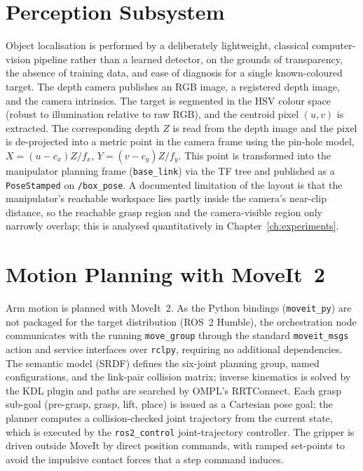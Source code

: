 \section{Perception Subsystem}
Object localisation is performed by a deliberately lightweight, classical
computer-vision pipeline rather than a learned detector, on the grounds of
transparency, the absence of training data, and ease of diagnosis for a single
known-coloured target. The depth camera publishes an RGB image, a registered depth
image, and the camera intrinsics. The target is segmented in the HSV colour space
(robust to illumination relative to raw RGB), and the centroid pixel $(u,v)$ is
extracted. The corresponding depth $Z$ is read from the depth image and the pixel is
de-projected into a metric point in the camera frame using the pin-hole model,
$X = (u-c_x)Z/f_x$, $Y = (v-c_y)Z/f_y$. This point is transformed into the
manipulator planning frame (\texttt{base\_link}) via the TF tree and published as a
\texttt{PoseStamped} on \texttt{/box\_pose}. A documented limitation of the layout is
that the manipulator's reachable workspace lies partly inside the camera's near-clip
distance, so the reachable grasp region and the camera-visible region only narrowly
overlap; this is analysed quantitatively in Chapter~\ref{ch:experiments}.

\section{Motion Planning with MoveIt~2}
Arm motion is planned with MoveIt~2. As the Python bindings (\texttt{moveit\_py}) are
not packaged for the target distribution (ROS~2 Humble), the orchestration node
communicates with the running \texttt{move\_group} through the standard
\texttt{moveit\_msgs} action and service interfaces over \texttt{rclpy}, requiring no
additional dependencies. The semantic model (SRDF) defines the six-joint planning
group, named configurations, and the link-pair collision matrix; inverse kinematics
is solved by the KDL plugin and paths are searched by OMPL's RRTConnect. Each grasp
sub-goal (pre-grasp, grasp, lift, place) is issued as a Cartesian pose goal; the
planner computes a collision-checked joint trajectory from the current state, which is
executed by the \texttt{ros2\_control} joint-trajectory controller. The gripper is
driven outside MoveIt by direct position commands, with ramped set-points to avoid the
impulsive contact forces that a step command induces.

